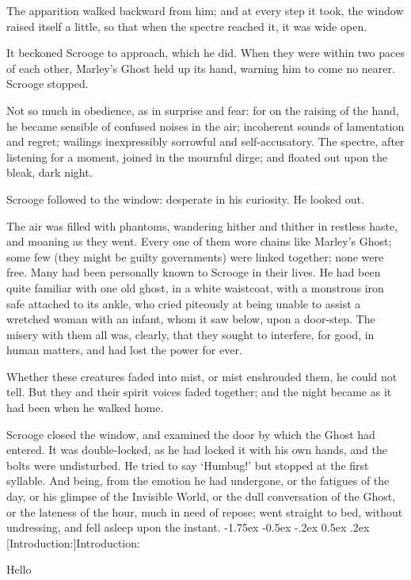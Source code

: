 \documentclass[11pt,twoside]{article}\makeatletter
\makeatletter
\renewcommand\section{\@startsection {section}{1}{\z@}%
     {-1.75ex \@plus -0.5ex \@minus -.2ex}%
     {0.5ex \@plus .2ex}%
     {\reset@font\Large\bfseries\sffamily}}
\renewcommand\subsection{\@startsection{subsection}{2}{\z@}%
     {-1.75ex\@plus -0.5ex \@minus- .2ex}%
     {0.5ex \@plus .2ex}%
     {\reset@font\Large\sffamily}}
\def\DivII{\subsection}
\def\DivII{\section}
\makeatother
\begin{document}
The apparition walked backward from him; and at every step it took, the window raised itself a little, so that when the spectre reached it, it was wide open.  \par
It beckoned Scrooge to approach, which he did.  When they were within two paces of each other, Marley's Ghost held up its hand, warning him to come no nearer.  Scrooge stopped.  \par
Not so much in obedience, as in surprise and fear: for on the raising of the hand, he became sensible of confused noises in the air; incoherent sounds of lamentation and regret; wailings inexpressibly sorrowful and self-accusatory.  The spectre, after listening for a moment, joined in the mournful dirge; and floated out upon the bleak, dark night.   \par
Scrooge followed to the window: desperate in his curiosity.  He looked out.  \par
The air was filled with phantoms, wandering hither and thither in restless haste, and moaning as they went. Every one of them wore chains like Marley's Ghost; some few (they might be guilty governments) were linked together; none were free. Many had been personally known to Scrooge in their lives. He had been quite familiar with one old ghost, in a white waistcoat, with a monstrous iron safe attached to its ankle, who cried piteously at being unable to assist a wretched woman with an  infant, whom it saw below, upon a door-step. The misery with them all was, clearly, that they sought to interfere, for good, in human matters, and had lost the power for ever.    \par
Whether these creatures faded into mist, or mist enshrouded them, he could not tell.  But they and their spirit voices faded together; and the night became as it had been when he walked home.  \par
Scrooge closed the window, and examined the door by which the Ghost had entered.  It was double-locked, as he had locked it with his own hands, and the bolts were undisturbed. He tried to say ‘Humbug!’ but stopped at the first syllable.  And being, from the emotion he had undergone, or the fatigues of the day, or his glimpse of the Invisible World, or the dull conversation of the Ghost, or the lateness of the hour, much in need of repose; went straight to bed, without undressing, and fell asleep upon the instant. 
\DivII[Introduction:]{Introduction:}\par
Hello
\end{document}
